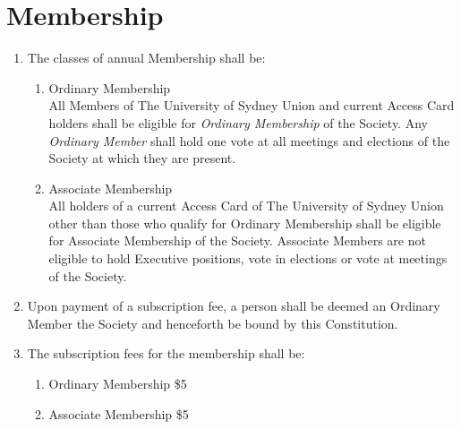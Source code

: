 \documentclass[11pt]{article}
\begin{document}
\section{Membership}
\begin{enumerate}[\thesection .1]
    \item The classes of annual Membership shall be:
    \begin{enumerate}
        \item Ordinary Membership \\ All Members of The University of Sydney Union and current Access Card holders shall be eligible for \textit{Ordinary Membership} of the Society. Any \textit{Ordinary Member} shall hold one vote at all meetings and elections of the Society at which they are present.
        \item Associate Membership \\ All holders of a current Access Card of The University of Sydney Union other than those who qualify for Ordinary Membership shall be eligible for Associate Membership of the Society. Associate Members are not eligible to hold Executive positions, vote in elections or vote at meetings of the Society.
    \end{enumerate}
    \item Upon payment of a subscription fee, a person shall be deemed an Ordinary Member the Society and henceforth be bound by this Constitution.
    \item The subscription fees for the membership shall be:
    \begin{enumerate}
        \item Ordinary Membership \$5
        \item Associate Membership \$5
    \end{enumerate}
\end{enumerate}
\end{document}
